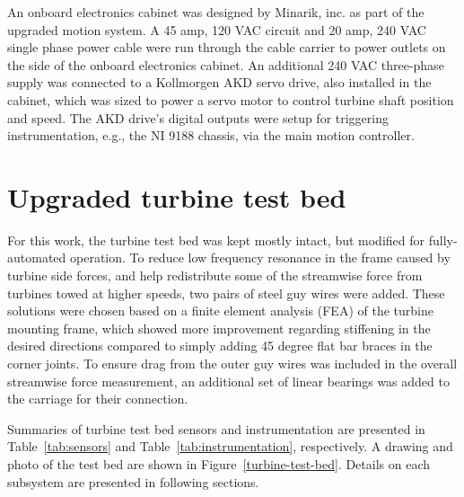 An onboard electronics cabinet was designed by Minarik, inc. as part of the
upgraded motion system. A 45 amp, 120 VAC circuit and 20 amp, 240 VAC single
phase power cable were run through the cable carrier to power outlets on the
side of the onboard electronics cabinet. An additional 240 VAC three-phase
supply was connected to a Kollmorgen AKD servo drive, also installed in the
cabinet, which was sized to power a servo motor to control turbine shaft
position and speed. The AKD drive's digital outputs were setup for triggering
instrumentation, e.g., the NI 9188 chassis, via the main motion controller.


\section{Upgraded turbine test bed}

For this work, the turbine test bed was kept mostly intact, but modified for
fully-automated operation. To reduce low frequency resonance in the frame caused
by turbine side forces, and help redistribute some of the streamwise force from
turbines towed at higher speeds, two pairs of steel guy wires were added. These
solutions were chosen based on a finite element analysis (FEA) of the turbine
mounting frame, which showed more improvement regarding stiffening in the
desired directions compared to simply adding 45 degree flat bar braces in the
corner joints. To ensure drag from the outer guy wires was included in the
overall streamwise force measurement, an additional set of linear bearings was
added to the carriage for their connection.

Summaries of turbine test bed sensors and instrumentation are presented in
Table~\ref{tab:sensors} and Table~\ref{tab:instrumentation}, respectively. A
drawing and photo of the test bed are shown in
Figure~\ref{turbine-test-bed}. Details on each subsystem are presented in
following sections.

